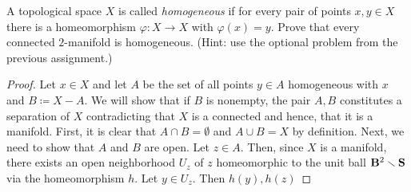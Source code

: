 \newpage
\begin{problem}[B]
A topological space $X$ is called \emph{homogeneous} if for every pair of
points $x,y\in X$ there is a homeomorphism $\varphi\colon X\to X$ with
$\varphi(x)=y$. Prove that every connected $2$-manifold is
homogeneous. (Hint: use the optional problem from the previous assignment.)
\end{problem}
\begin{proof}
Let $x\in X$ and let $A$ be the set of all points $y\in A$ homogeneous with
$x$ and $B\coloneqq X\minus A$. We will show that if $B$ is nonempty, the
pair $A,B$ constitutes a separation of $X$ contradicting that $X$ is a
connected and hence, that it is a manifold. First, it is clear that $A\cap
B=\emptyset$ and $A\cup B=X$ by definition. Next, we need to show that $A$
and $B$ are open. Let $z\in A$. Then, since $X$ is a manifold, there exists
an open neighborhood $U_z$ of $z$ homeomorphic to the unit ball
$\mathbf{B}^2\smallsetminus\mathbf{S}$ via the homeomorphism $h$. Let $y\in U_z$. Then
$h(y),h(z)$
\end{proof}

